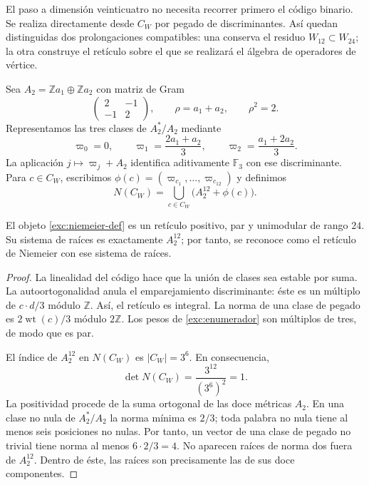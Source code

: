 El paso a dimensión veinticuatro no necesita recorrer primero el
código binario. Se realiza directamente desde $C_W$ por pegado de
discriminantes. Así quedan distinguidas dos prolongaciones compatibles:
una conserva el residuo $W_{12}\subset W_{24}$; la otra construye el
retículo sobre el que se realizará el álgebra de operadores de vértice.

Sea $A_2=\mathbb Z a_1\oplus\mathbb Z a_2$ con matriz de Gram
\[
 \begin{pmatrix}2&-1\\-1&2\end{pmatrix},
 \qquad \rho=a_1+a_2,\qquad \rho^2=2.
\]
Representamos las tres clases de $A_2^*/A_2$ mediante
\[
 \varpi_0=0,\qquad
 \varpi_1=\frac{2a_1+a_2}{3},\qquad
 \varpi_2=\frac{a_1+2a_2}{3}.
\]
La aplicación $j\mapsto\varpi_j+A_2$ identifica aditivamente
$\mathbb F_3$ con ese discriminante. Para $c\in C_W$, escribimos
$\phi(c)=(\varpi_{c_1},\ldots,\varpi_{c_{12}})$ y definimos
\begin{equation}
 N(C_W)=\bigcup_{c\in C_W}\bigl(A_2^{12}+\phi(c)\bigr).
 \label{exc:niemeier-def}
\end{equation}

\begin{theorem}
\label{exc:niemeier-teorema}
El objeto \eqref{exc:niemeier-def} es un retículo positivo, par y
unimodular de rango $24$. Su sistema de raíces es exactamente
$A_2^{12}$; por tanto, se reconoce como el retículo de Niemeier con
ese sistema de raíces.
\end{theorem}

\begin{proof}
La linealidad del código hace que la unión de clases sea estable por
suma. La autoortogonalidad anula el emparejamiento discriminante:
éste es un múltiplo de $c\cdot d/3$ módulo $\mathbb Z$. Así, el
retículo es integral. La norma de una clase de pegado es
$2\operatorname{wt}(c)/3$ módulo $2\mathbb Z$. Los pesos de
\eqref{exc:enumerador} son múltiplos de tres, de modo que es par.

El índice de $A_2^{12}$ en $N(C_W)$ es $|C_W|=3^6$. En consecuencia,
\[
 \det N(C_W)=\frac{3^{12}}{(3^6)^2}=1.
\]
La positividad procede de la suma ortogonal de las doce métricas $A_2$.
En una clase no nula de $A_2^*/A_2$ la norma mínima es $2/3$;
toda palabra no nula tiene al menos seis posiciones no nulas.
Por tanto, un vector de una clase de pegado no trivial tiene norma
al menos $6\cdot2/3=4$. No aparecen raíces de norma dos fuera de
$A_2^{12}$. Dentro de éste, las raíces son precisamente las de sus
doce componentes.
\end{proof}

